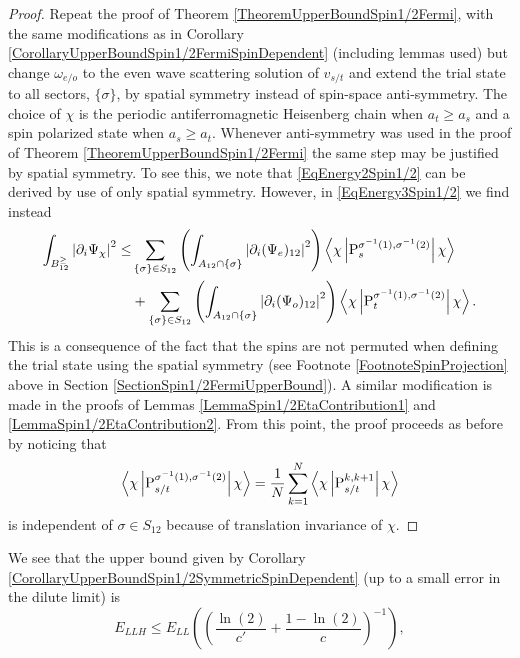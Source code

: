 \begin{proof}
	Repeat the proof of Theorem \ref{TheoremUpperBoundSpin1/2Fermi}, with the same modifications as in Corollary \ref{CorollaryUpperBoundSpin1/2FermiSpinDependent} (including lemmas used) but change $ \omega_{e/o} $ to the even wave scattering solution of $ v_{s/t} $ and extend the trial state to all sectors, $ \{\sigma\} $, by spatial symmetry instead of spin-space anti-symmetry. The choice of $ \chi $ is the periodic antiferromagnetic Heisenberg chain when $ a_t\geq a_s $ and a spin polarized state when $ a_s\geq a_t $.
	Whenever anti-symmetry was used in the proof of Theorem \ref{TheoremUpperBoundSpin1/2Fermi} the same step may be justified by spatial symmetry. To see this, we note that \eqref{EqEnergy2Spin1/2} can be derived by use of only spatial symmetry. However, in \eqref{EqEnergy3Spin1/2} we find instead
	\begin{equation}
	\begin{aligned}
	\int_{B_{12}^{\geq}}\left\lvert \partial_i\Psi_{\chi} \right\rvert^2\leq&\sum_{\{\sigma\}\in S_{12}}\left(\int_{A_{12}\cap\{\sigma\}}\left\lvert \partial_i(\Psi_e)_{12} \right\rvert^2\right)\left\langle\chi \left\lvert \operatorname{P}^{\sigma^{-1}(1),\sigma^{-1}(2)}_s  \right\rvert \chi\right\rangle\\
	&+\sum_{\{\sigma\}\in S_{12}}\left(\int_{A_{12}\cap \{\sigma\}}\left\lvert \partial_i(\Psi_o)_{12} \right\rvert^2\right)\left\langle\chi \left\lvert \operatorname{P}^{\sigma^{-1}(1),\sigma^{-1}(2)}_t  \right\rvert \chi\right\rangle.
	\end{aligned}
	\end{equation}
	 This is a consequence of the fact that the spins are not permuted when defining the trial state using the spatial symmetry (see Footnote \ref{FootnoteSpinProjection} above in Section \ref{SectionSpin1/2FermiUpperBound}). A similar modification is made in the proofs of Lemmas \ref{LemmaSpin1/2EtaContribution1} and \ref{LemmaSpin1/2EtaContribution2}. From this point, the proof proceeds as before by noticing that 
	$$ \left\langle\chi \left\lvert \operatorname{P}^{\sigma^{-1}(1),\sigma^{-1}(2)}_{s/t}  \right\rvert \chi\right\rangle=\frac{1}{N}\sum_{k=1}^{N}\left\langle\chi \left\lvert \operatorname{P}^{k,k+1}_{s/t}  \right\rvert \chi\right\rangle $$
	is independent of $ \sigma\in S_{12} $ because of translation invariance of $ \chi $.
\end{proof}
We see that the upper bound given by Corollary \ref{CorollaryUpperBoundSpin1/2SymmetricSpinDependent} (up to a small error in the dilute limit) is \begin{equation}
E_{LLH}\leq E_{LL}\left(\left(\frac{\ln(2)}{c'}+\frac{1-\ln(2)}{c}\right)^{-1}\right),
\end{equation}
